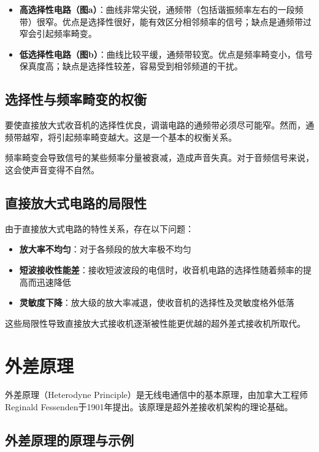 \begin{itemize}
    \item \textbf{高选择性电路（图a）}：曲线非常尖锐，通频带（包括谐振频率左右的一段频带）很窄。优点是选择性很好，能有效区分相邻频率的信号；缺点是通频带过窄会引起频率畸变。
    
    \item \textbf{低选择性电路（图b）}：曲线比较平缓，通频带较宽。优点是频率畸变小，信号保真度高；缺点是选择性较差，容易受到相邻频道的干扰。
\end{itemize}

\subsection{选择性与频率畸变的权衡}

要使直接放大式收音机的选择性优良，调谐电路的通频带必须尽可能窄。然而，通频带越窄，将引起频率畸变越大。这是一个基本的权衡关系。

频率畸变会导致信号的某些频率分量被衰减，造成声音失真。对于音频信号来说，这会使声音变得不自然。

\subsection{直接放大式电路的局限性}

由于直接放大式电路的特性关系，存在以下问题：

\begin{itemize}
    \item \textbf{放大率不均匀}：对于各频段的放大率极不均匀
    \item \textbf{短波接收性能差}：接收短波波段的电信时，收音机电路的选择性随着频率的提高而迅速降低
    \item \textbf{灵敏度下降}：放大级的放大率减退，使收音机的选择性及灵敏度格外低落
\end{itemize}

这些局限性导致直接放大式接收机逐渐被性能更优越的超外差式接收机所取代。

\section{外差原理}
\label{sec:heterodyne_principle}

外差原理（Heterodyne Principle）是无线电通信中的基本原理，由加拿大工程师Reginald Fessenden于1901年提出。该原理是超外差接收机架构的理论基础。

\subsection{外差原理的原理与示例}

